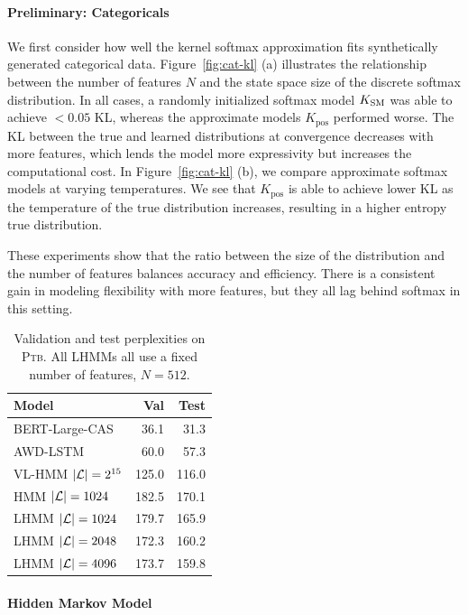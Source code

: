 \documentclass{article}
\begin{document}
\paragraph{Preliminary: Categoricals}
We first consider how well the kernel softmax approximation 
fits synthetically generated categorical data.
Figure~\ref{fig:cat-kl} (a) illustrates the relationship between the number of features $N$ and the state space size of the discrete softmax distribution. In all cases, a randomly initialized softmax model $K_{\mathrm{SM}}$ was able to achieve $< 0.05$ KL, whereas the approximate models $K_{\textrm{pos}}$ performed worse. The KL between the true and learned distributions at convergence decreases with more features, which lends the model more expressivity but increases the computational cost.
In Figure~\ref{fig:cat-kl} (b), we compare approximate softmax models at varying temperatures. We see that $K_{\textrm{pos}}$ is able to achieve lower KL as the temperature of the true distribution increases, resulting in a higher entropy true distribution.

These experiments show that the ratio between the size of the distribution and the number of features balances accuracy and efficiency.
There is a consistent gain in modeling flexibility with more features, but they all lag 
behind softmax in this setting.

\begin{table}[!t]
\centering
\begin{tabular}{lrr}
\toprule
Model & Val & Test\\
\midrule
BERT-Large-CAS & 36.1 & 31.3\\
AWD-LSTM & 60.0 & 57.3\\
VL-HMM $|\mathcal{L}|=2^{15}$ & 125.0 & 116.0\\
HMM $|\mathcal{L}|=1024$ & 182.5 & 170.1\\
LHMM $|\mathcal{L}|=1024$ & 179.7 & 165.9\\
LHMM $|\mathcal{L}|=2048$ & 172.3 & 160.2\\
LHMM $|\mathcal{L}|=4096$ & 173.7 & 159.8\\
\bottomrule
\end{tabular}
\caption{\label{tbl:hmm-ppl}
Validation and test perplexities on \textsc{Ptb}.
All LHMMs all use a fixed number of features, $N = 512$.
}
\end{table}
\paragraph{Hidden Markov Model}
\end{document}
